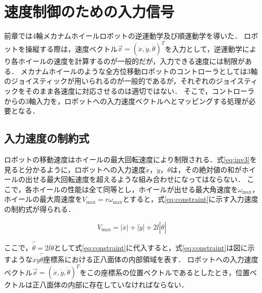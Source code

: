 \section{速度制御のための入力信号}

前章では4輪メカナムホイールロボットの逆運動学及び順運動学を導いた．
ロボットを操縦する際は，速度ベクトル$\vec{x} = (\dot{x}, \dot{y}, \dot{\theta})^T$を入力として，逆運動学により各ホイールの速度を計算するのが一般的だが，入力できる速度には制限がある．
メカナムホイールのような全方位移動ロボットのコントローラとしては3軸のジョイスティックが用いられるのが一般的であるが，それぞれのジョイスティックをそのまま各速度に対応させるのは適切ではない．
そこで，コントローラからの3軸入力を，ロボットへの入力速度ベクトルへとマッピングする処理が必要となる．

\subsection{入力速度の制約式}

ロボットの移動速度はホイールの最大回転速度により制限される．式\ref{eq:inv3}を見ると分かるように，ロボットへの入力速度$\dot{x}$，$\dot{y}$，$\dot{\theta}$は，その絶対値の和がホイールの出せる最大回転速度を超えるような組み合わせになってはならない．
ここで，各ホイールの性能は全て同等とし，ホイールが出せる最大角速度を$\omega_{\text{max}}$，ホイールの最大周速度を$V_{\text{max}} = r \omega_{\text{max}}$とすると，式\ref{eq:constraint}に示す入力速度の制約式が得られる．

\begin{equation}
  V_{\text{max}} = |\dot{x}| + |\dot{y}| + 2l|\dot{\theta}|
  \label{eq:constraint}
\end{equation}

ここで，$\hat{\dot{\theta}} = 2l\dot{\theta}$として式\ref{eq:constraint}に代入すると，式\ref{eq:constraint}は図に示すような$\dot{x}\dot{y}\hat{\dot{\theta}}$座標系における正八面体の内部領域を表す．
ロボットへの入力速度ベクトル$\vec{x} = (\dot{x}, \dot{y}, \dot{\theta})^T$をこの座標系の位置ベクトルであるとしたとき，位置ベクトルは正八面体の内部に存在していなければならない．

